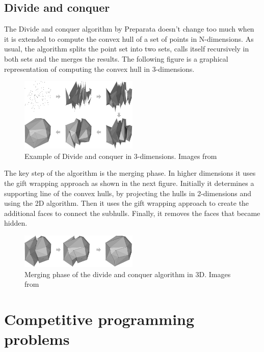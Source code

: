 \documentclass{article}
\begin{document}
\subsection{Divide and conquer}

The Divide and conquer algorithm by Preparata doesn't change too much when it is extended to compute the convex hull of a set of points in N-dimensions. As usual, the algorithm splits the point set into two sets, calls itself recursively in both sets and the merges the results. The following figure is a graphical representation of computing the convex hull in 3-dimensions.

\begin{figure}[h]
\centering
\includegraphics[width=0.5\textwidth]{higher_dim/divide_and_conquer_3d.png}
\caption{\label{fig:divide_and_conquer_3d}Example of Divide and conquer in 3-dimensions. Images from \cite{divideandconquer3d}}
\end{figure}

The key step of the algorithm is the merging phase. In higher dimensions it uses the gift wrapping approach as shown in the next figure. Initially it determines a supporting line of the convex hulls, by projecting the hulls in 2-dimensions and using the 2D algorithm. Then it uses the gift wrapping approach to create the additional faces to connect the subhulls. Finally, it removes the faces that became hidden.

\begin{figure}[h]
\centering
\includegraphics[width=0.5\textwidth]{higher_dim/divide_and_conquer_3d_merge.png}
\caption{\label{fig:divide_and_conquer_3d_merge} Merging phase of the divide and conquer algorithm in 3D. Images from \cite{divideandconquer3d}}
\end{figure}

\newpage
\section{Competitive programming problems}
\end{document}
